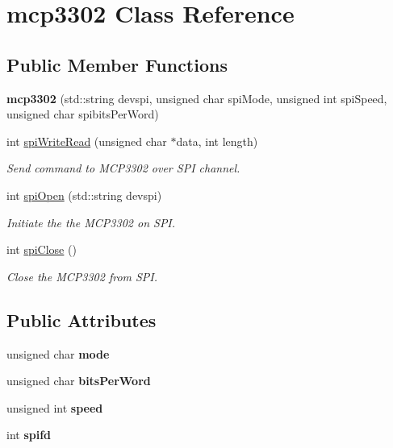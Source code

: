 \hypertarget{classmcp3302}{\section{mcp3302 Class Reference}
\label{classmcp3302}
}
\subsection*{Public Member Functions}
\begin{DoxyCompactItemize}
\item 
\hypertarget{classmcp3302_a52dca1d23544e7d70a796ecefbf5aaf2}{{\bfseries mcp3302} (std\+::string devspi, unsigned char spi\+Mode, unsigned int spi\+Speed, unsigned char spibits\+Per\+Word)}\label{classmcp3302_a52dca1d23544e7d70a796ecefbf5aaf2}

\item 
int \hyperlink{classmcp3302_a86fc18dbe01edaccd613eb707d66b7bc}{spi\+Write\+Read} (unsigned char $\ast$data, int length)
\begin{DoxyCompactList}\small\item\em Send command to M\+C\+P3302 over S\+P\+I channel. \end{DoxyCompactList}\item 
int \hyperlink{classmcp3302_a70cbe817505add73c96fc7e8d54e263d}{spi\+Open} (std\+::string devspi)
\begin{DoxyCompactList}\small\item\em Initiate the the M\+C\+P3302 on S\+P\+I. \end{DoxyCompactList}\item 
int \hyperlink{classmcp3302_ae543c5d2a6da21893efb140f30bd1c2d}{spi\+Close} ()
\begin{DoxyCompactList}\small\item\em Close the M\+C\+P3302 from S\+P\+I. \end{DoxyCompactList}\end{DoxyCompactItemize}
\subsection*{Public Attributes}
\begin{DoxyCompactItemize}
\item 
\hypertarget{classmcp3302_a00ca968368680d58adb31188c3016228}{unsigned char {\bfseries mode}}\label{classmcp3302_a00ca968368680d58adb31188c3016228}

\item 
\hypertarget{classmcp3302_adc497ea64ef1ebde0e5204e893fcd205}{unsigned char {\bfseries bits\+Per\+Word}}\label{classmcp3302_adc497ea64ef1ebde0e5204e893fcd205}

\item 
\hypertarget{classmcp3302_a3a4f3ccbd360eadb941fb3a479beab39}{unsigned int {\bfseries speed}}\label{classmcp3302_a3a4f3ccbd360eadb941fb3a479beab39}

\item 
\hypertarget{classmcp3302_a2ac2fc78502a1530053b29c82bbd92a5}{int {\bfseries spifd}}\label{classmcp3302_a2ac2fc78502a1530053b29c82bbd92a5}

\end{DoxyCompactItemize}


